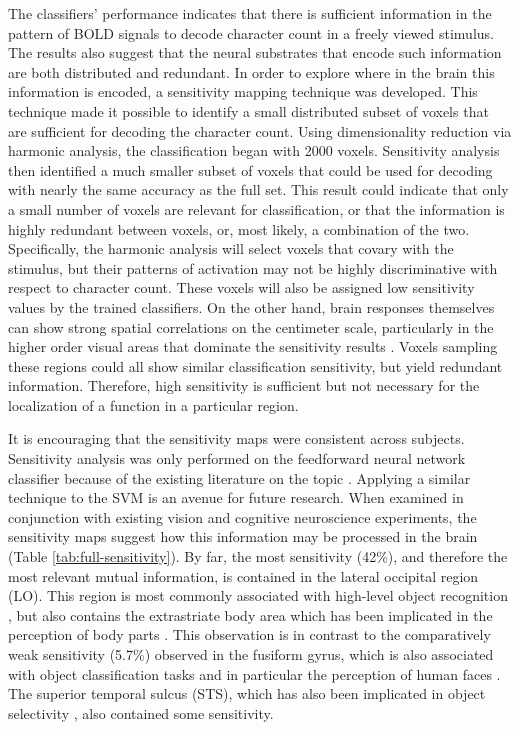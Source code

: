 \documentclass[5p,authoryear]{elsarticle}
\begin{document}
The classifiers' performance indicates that there is sufficient information in the pattern of BOLD signals to decode character count in a freely viewed stimulus. 
The results also suggest that the neural substrates that encode such information are both distributed and redundant.
In order to explore where in the brain this information is encoded, a sensitivity mapping technique was developed.
This technique made it possible to identify a small distributed subset of voxels that are sufficient for decoding the character count.
Using dimensionality reduction via harmonic analysis, the classification began with 2000 voxels.
Sensitivity analysis then identified a much smaller subset of voxels that could be used for decoding with nearly the same accuracy as the full set.
This result could indicate that only a small number of voxels are relevant for classification, or that the information is highly redundant between voxels, or, most likely, a combination of the two.
Specifically, the harmonic analysis will select voxels that covary with the stimulus, but their patterns of activation may not be highly discriminative with respect to character count.
These voxels will also be assigned low sensitivity values by the trained classifiers.
On the other hand, brain responses themselves can show strong spatial correlations on the centimeter scale, particularly in the higher order visual areas that dominate the sensitivity results \citep{Engel1997}. 
Voxels sampling these regions could all show similar classification sensitivity, but yield redundant information.
Therefore, high sensitivity is sufficient but not necessary for the localization of a function in a particular region.

It is encouraging that the sensitivity maps were consistent across subjects.
Sensitivity analysis was only performed on the feedforward neural network classifier because of the existing literature on the topic \citep{Zurada1994}.
Applying a similar technique to the SVM is an avenue for future research.
When examined in conjunction with existing vision and cognitive neuroscience experiments, the sensitivity maps suggest how this information may be processed in the brain (Table \ref{tab:full-sensitivity}).
By far, the most sensitivity (42\%), and therefore the most relevant mutual information, is contained in the lateral occipital region (LO).
This region is most commonly associated with high-level object recognition \citep{Grill-Spector2001}, but also contains the extrastriate body area which has been implicated in the perception of body parts \citep{Astafiev2004}.
This observation is in contrast to the comparatively weak sensitivity (5.7\%) observed in the fusiform gyrus, which is also associated with object classification tasks and in particular the perception of human faces \citep{Kanwisher1997,Sayres2010}.
The superior temporal sulcus (STS), which has also been implicated in object selectivity \citep{Hasselmo1989,Beauchamp2004}, also contained some sensitivity. 
\end{document}
